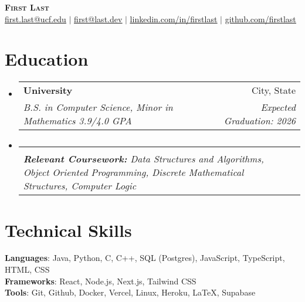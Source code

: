 \documentclass[letterpaper,11pt]{article}
\makeatletter
\newcommand{\resumeSubheading}[4]{
  \vspace{-2pt}\item
    \begin{tabular*}{0.97\textwidth}[t]{l@{\extracolsep{\fill}}r}
      \textbf{#1} & #2 \\
      \textit{\small#3} & \textit{\small #4} \\
    \end{tabular*}\vspace{-7pt}
}
\newcommand{\resumeSubHeadingListStart}{\begin{itemize}[leftmargin=0.15in, label={}]}
\newcommand{\resumeSubHeadingListEnd}{\end{itemize}}
\makeatother
\begin{document}

\begin{center}
    \textbf{\Huge \scshape First Last} \\ \vspace{1pt}
    \href{mailto:first.last@ucf.edu}{\underline{first.last@ucf.edu}} $|$ \href{mailto:first@last.dev}{\underline{first@last.dev}} $|$ 
    \href{https://linkedin.com/in/firstlast}{\underline{linkedin.com/in/firstlast}} $|$
    \href{https://github.com/firstlast}{\underline{github.com/firstlast}}
\end{center}


\section{Education}
  \resumeSubHeadingListStart
    \resumeSubheading
      {University}{City, State}
      {B.S. in Computer Science, Minor in Mathematics 3.9/4.0 GPA}{Expected Graduation: 2026}
    
      \vspace{-15pt}
    \resumeSubheading
      {}{}
      {\scriptsize{\textbf{Relevant Coursework: }Data Structures and Algorithms, Object Oriented Programming, Discrete Mathematical Structures, Computer Logic}}{}
  \resumeSubHeadingListEnd

\section{Technical Skills}
 \begin{itemize}[leftmargin=0.15in, label={}]
    \small{\item{
     \textbf{Languages}{: Java, Python, C, C++, SQL (Postgres), JavaScript, TypeScript, HTML, CSS} \\
     \textbf{Frameworks}{: React, Node.js, Next.js, Tailwind CSS} \\
     \textbf{Tools}{: Git, Github, Docker, Vercel, Linux, Heroku, LaTeX, Supabase} \\
    }}
 \end{itemize}
\end{document}
